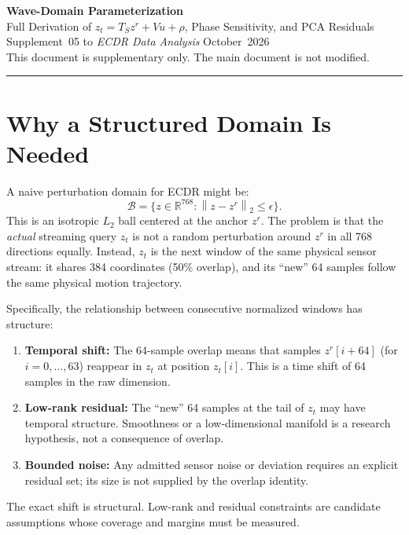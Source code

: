 \documentclass[11pt, a4paper]{article}
\theoremstyle{definition}
\theoremstyle{plain}
\newcommand{\R}{\mathbb{R}}
\newcommand{\norm}[2]{\left\|#1\right\|_{#2}}
\begin{document}
\begin{center}
  {\LARGE\bfseries\color{teal} Wave-Domain Parameterization}\\[0.5em]
  {\large\color{muted} Full Derivation of $z_t = T_S z^r + Vu + \rho$, Phase Sensitivity, and PCA Residuals}\\[1.2em]
  {\normalsize Supplement~05 to \textit{ECDR Data Analysis} \textbar{} October~2026}\\[0.3em]
  {\small\color{muted} This document is supplementary only. The main document is not modified.}
\end{center}

\vspace{1em}\hrule\vspace{1em}

\tableofcontents
\clearpage

\section{Why a Structured Domain Is Needed}

A naive perturbation domain for ECDR might be:
\[
  \mathcal{B} = \bigl\{ z \in \R^{768} : \norm{z - z^r}{2} \le \epsilon \bigr\}.
\]
This is an isotropic $L_2$ ball centered at the anchor $z^r$. The problem is that
the \emph{actual} streaming query $z_t$ is not a random perturbation around $z^r$
in all 768 directions equally. Instead, $z_t$ is the next window of the same
physical sensor stream: it shares 384 coordinates (50\% overlap), and its
``new'' 64 samples follow the same physical motion trajectory.

Specifically, the relationship between consecutive normalized windows has structure:
\begin{enumerate}[leftmargin=1.5em]
  \item \textbf{Temporal shift:} The 64-sample overlap means that samples
        $z^r[i+64]$ (for $i = 0, \ldots, 63$) reappear in $z_t$ at position $z_t[i]$.
        This is a time shift of 64 samples in the raw dimension.
  \item \textbf{Low-rank residual:} The ``new'' 64 samples at the tail of $z_t$
        may have temporal structure. Smoothness or a low-dimensional manifold is a research hypothesis, not a consequence of overlap.
  \item \textbf{Bounded noise:} Any admitted sensor noise or deviation requires an explicit residual set; its size is not supplied by the overlap identity.
\end{enumerate}
The exact shift is structural. Low-rank and residual constraints are candidate assumptions whose coverage and margins must be measured.
\end{document}
